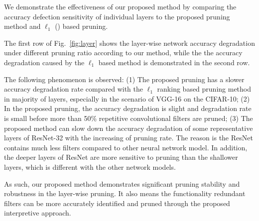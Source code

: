 \documentclass{article} %
\begin{document}
We demonstrate the effectiveness of our proposed method by comparing the accuracy defection sensitivity of individual layers to the proposed pruning method and $\ell_1$ (\cite{Li:2016:pruning}) based pruning.

The first row of Fig.~\ref{fig:layer} shows the layer-wise network accuracy degradation under different pruning ratio according to our method, while the the accuracy degradation caused by the $\ell_1$ based method is demonstrated in the second row.

The following phenomenon is observed:
(1) The proposed pruning has a slower accuracy degradation rate compared with the $\ell_1$ ranking based pruning method in majority of layers, especially in the scenario of VGG-16 on the CIFAR-10;
(2) In the proposed pruning, the accuracy degradation is slight and degradation rate is small before more than 50\% repetitive convolutional filters are pruned;
(3) The proposed method can slow down the accuracy degradation of some representative layers of ResNet-32 with the increasing of pruning rate.
The reason is the ResNet contains much less filters compared to other neural network model.
In addition, the deeper layers of ResNet are more sensitive to pruning than the shallower layers, which is different with the other network models.


As such, our proposed method demonstrates significant pruning stability and robustness in the layer-wise pruning.
It also means the functionality redundant filters can be more accurately identified and pruned through the proposed interpretive approach.
\end{document}
